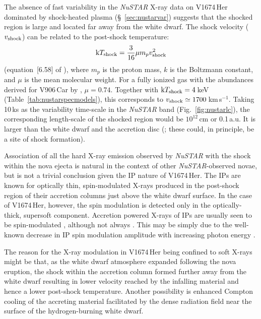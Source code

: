 \documentclass[a4paper,fleqn,usenatbib]{mnras}
\newcommand{\nova}{V1674\,Her}
\begin{document}
The absence of fast variability in the {\em NuSTAR} X-ray data on \nova{} 
dominated by shock-heated plasma (\S~\ref{sec:nustarvar}) suggests that the shocked
region is large and located far away from the white dwarf.
The shock velocity ($v_{\rm shock}$) can be related to the post-shock temperature:
\begin{equation}
{\rm k} T_{\rm shock} = \frac{3}{16} \mu m_p v_{\rm shock}^2
\label{eq:ktshock}
\end{equation}
(equation~[6.58] of \citealt{1997pism.book.....D}),
where $m_p$ is the proton mass, $k$ is the Boltzmann constant, and $\mu$ is the mean molecular weight. 
For a fully ionized gas with the abundances derived for V906\,Car by \cite{2020MNRAS.497.2569S},
$\mu=0.74$. Together with ${\rm k} T_{\rm shock} = 4$\,keV (Table~\ref{tab:nustarspecmodels}),
this corresponds to $v_{\rm shock} \simeq 1700$\,km\,s$^{-1}$.
Taking 10\,ks as the variability time-scale in the {\em NuSTAR}
band (Fig.~\ref{fig:nustarlc}), the corresponding length-scale of the shocked
region would be $10^{12}$\,cm or 0.1\,a.u. It is larger than the white dwarf
and the accretion disc (\citealt{2018A&A...613A...8F}; these could, in principle, be a site of shock formation).

Association of all the hard X-ray emission observed by {\em NuSTAR} with the
shock within the nova ejecta is natural in the context of other {\em NuSTAR}-observed novae, 
but is not a trivial conclusion given the IP nature of \nova{}. 
%
The IPs are known for optically thin, spin-modulated X-rays \citep{1989MNRAS.237..853N} 
produced in the post-shock region of their accretion columns just above the white dwarf surface.
In the case of \nova{}, however, the spin modulation is detected only in the optically-thick, supersoft component. 
Accretion powered X-rays of IPs are usually seen to be spin-modulated
\citep{2015ApJ...807L..30M}, although not always \citep[see e.g.][]{2022MNRAS.511.4582C}. 
This may be simply due to the well-known decrease in IP spin modulation amplitude with 
increasing photon energy \citep{1989MNRAS.237..853N}.

The reason for the X-ray modulation in \nova{} being confined to soft 
X-rays might be that, as the white dwarf atmosphere expanded following 
the nova eruption, 
the shock within the accretion column formed further away 
from the white dwarf resulting in lower velocity reached by 
the infalling material and hence a lower post-shock temperature.
%
Another possibility is enhanced Compton cooling of the accreting material 
\citep{2002apa..book.....F,2011ApJ...737....7N}  
facilitated by the dense radiation field near the surface of 
the hydrogen-burning white dwarf.
\end{document}
